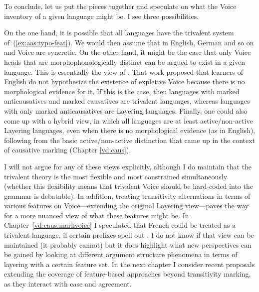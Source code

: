 To conclude, let us put the pieces together and speculate on what the Voice inventory of a given language might be. I see three possibilities.

On the one hand, it is possible that all languages have the trivalent system of~(\ref{ex:aas:typo-feat}). We would then assume that in English, German and so on {\vd} and Voice are syncretic. On the other hand, it might be the case that only Voice heads that are morphophonologically distinct can be argued to exist in a given language. This is essentially the view of \cite{layering15}. That work proposed that learners of English do not hypothesize the existence of expletive Voice because there is no morphological evidence for it. If this is the case, then languages with marked anticausatives and marked causatives are trivalent languages, whereas languages with only marked anticausatives are Layering languages. Finally, one could also come up with a hybrid view, in which all languages are at least active/non-active Layering languages, even when there is no morphological evidence (as in English), following from the basic active/non-active distinction that came up in the context of causative marking (Chapter \ref{vd:caus}).

I will not argue for any of these views explicitly, although I do maintain that the trivalent theory is the most flexible and most constrained simultaneously (whether this flexibility means that trivalent Voice should be hard-coded into the grammar is debatable). In addition, treating transitivity alternations in terms of various features on Voice---extending the original Layering view---paves the way for a more nuanced view of what these features might be. In Chapter~\ref{vd:caus:markvoice} I speculated that French could be treated as a trivalent language, if certain prefixes spell out {\vd}. I do not know if that view can be maintained (it probably cannot) but it does highlight what new perspectives can be gained by looking at different argument structure phenomena in terms of layering with a certain feature set. In the next chapter I consider recent proposals extending the coverage of feature-based approaches beyond transitivity marking, as they interact with case and agreement.



